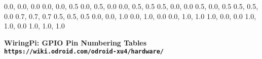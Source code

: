 \documentclass[12pt,a4paper]{article}
\begin{document}
\begin{sffamily}
\definecolor{rtb-black}{rgb}  {0.0, 0.0, 0.0}
\definecolor{rtb-navy}{rgb}   {0.0, 0.0, 0.5}
\definecolor{rtb-green}{rgb}  {0.0, 0.5, 0.0}
\definecolor{rtb-teal}{rgb}   {0.0, 0.5, 0.5}
\definecolor{rtb-maroon}{rgb} {0.5, 0.0, 0.0}
\definecolor{rtb-purple}{rgb} {0.5, 0.0, 0.5}
\definecolor{rtb-olive}{rgb}  {0.5, 0.5, 0.0}
\definecolor{rtb-silver}{rgb} {0.7, 0.7, 0.7}
\definecolor{rtb-grey}{rgb}   {0.5, 0.5, 0.5}
\definecolor{rtb-blue}{rgb}   {0.0, 0.0, 1.0}
\definecolor{rtb-lime}{rgb}   {0.0, 1.0, 0.0}
\definecolor{rtb-aqua}{rgb}   {0.0, 1.0, 1.0}
\definecolor{rtb-red}{rgb}    {1.0, 0.0, 0.0}
\definecolor{rtb-yellow}{rgb} {1.0, 1.0, 0.0}
\definecolor{rtb-white}{rgb}  {1.0, 1.0, 1.0}

\begin{center}
\bfseries{WiringPi: GPIO Pin Numbering Tables}\\
\tt{https://wiki.odroid.com/odroid-xu4/hardware/}
\end{center}


\end{sffamily}
\end{document}
